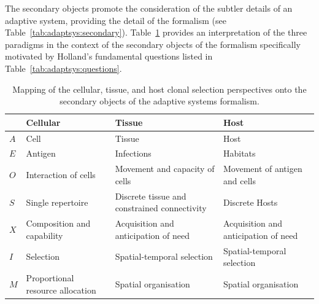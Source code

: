 The secondary objects promote the consideration of the subtler details of an adaptive system, providing the detail of the formalism (see Table~\ref{tab:adaptsys:secondary}). Table~\ref{tab:framework:hcsf:secondaryobjects} provides an interpretation of the three paradigms in the context of the secondary objects of the formalism specifically motivated by Holland's fundamental questions listed in Table~\ref{tab:adaptsys:questions}.

\begin{table}[htp]
	\centering\small
		\begin{tabularx}{\textwidth}{lXXX}
		\toprule
		 & \textbf{Cellular}  & \textbf{Tissue}  & \textbf{Host} \\ 
		\toprule
		$A$ & Cell & Tissue & Host \\ 
		\midrule
		$E$ & Antigen & Infections & Habitats \\ 
		\midrule
		$O$ & Interaction of cells & Movement and capacity of cells & Movement of antigen and cells \\ 
		\midrule
		$S$ & Single repertoire & Discrete tissue and constrained connectivity & Discrete Hosts \\ 
		\midrule
		$X$ & Composition and capability & Acquisition and anticipation of need & Acquisition and anticipation of need \\ 
		\midrule
		$I$ & Selection & Spatial-temporal selection & Spatial-temporal selection \\ 
		\midrule
		$M$ & Proportional resource allocation & Spatial organisation & Spatial organisation \\ 
		\bottomrule
		\end{tabularx}
	\caption{Mapping of the cellular, tissue, and host clonal selection perspectives onto the secondary objects of the adaptive systems formalism.}
	\label{tab:framework:hcsf:secondaryobjects}
\end{table}

